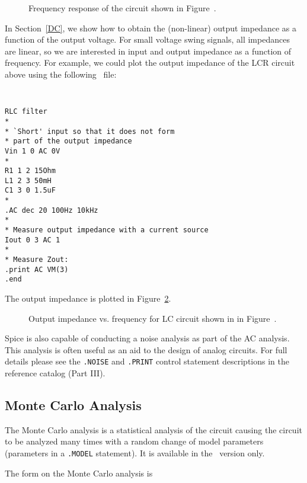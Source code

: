 \begin{figure}
\centerline{\epsfxsize=5in}
\caption{Frequency response of the circuit shown in Figure~\protect{\ref{LC}}.}
\label{LC-plot}
\end{figure}

In Section~\ref{DC}, we show how to obtain the (non-linear) output impedance
as a function of the output voltage.  For small voltage swing signals, all
impedances are linear, so we are interested in input and output impedance
as a function of frequency.
For example, we could plot the output impedance of the
LCR circuit above using the following \spice\ file:
{\tt
\begin{verbatim}
RLC filter
*
* `Short' input so that it does not form
* part of the output impedance
Vin 1 0 AC 0V
*
R1 1 2 15Ohm
L1 2 3 50mH
C1 3 0 1.5uF
*
.AC dec 20 100Hz 10kHz
*
* Measure output impedance with a current source
Iout 0 3 AC 1
*
* Measure Zout:
.print AC VM(3)
.end
\end{verbatim}
}
\par\noindent
The output impedance is plotted in Figure~\ref{zout}.

\begin{figure}
\centerline{\epsfxsize=6in}
\caption{Output impedance vs. frequency for LC
circuit shown in in Figure~\protect{\ref{LC}}.}
\label{zout}
\end{figure}

Spice is also capable of conducting a noise analysis as part of
the AC analysis.  This analysis is often useful as an aid to the
design of analog circuits.   For  full details please see the {\tt .NOISE}
and {\tt .PRINT} control statement descriptions in the reference catalog
(Part III).

\subsection{Monte Carlo Analysis}

The Monte Carlo analysis is a statistical analysis of the circuit causing
the circuit to be analyzed many times with a random change of model parameters
(parameters in a {\tt .MODEL} statement).
{It is available in the \pspice\ version only.}

The form on the Monte Carlo analysis is

{}

